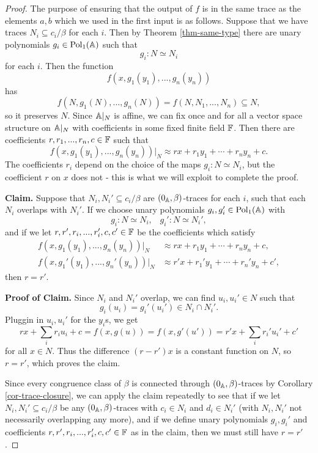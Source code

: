 \begin{appendices}
\begin{proof}
The purpose of ensuring that the output of $f$ is in the same trace as the elements $a,b$ which we used in the first input is as follows. Suppose that we have traces $N_i \subseteq c_i/\beta$ for each $i$. Then by Theorem \ref{thm-same-type} there are unary polynomials $g_i \in \operatorname{Pol}_1(\mathbb{A})$ such that
\[
g_i : N \simeq N_i
\]
for each $i$. Then the function
\[
f(x,g_1(y_1), ..., g_n(y_n))
\]
has
\[
f(N,g_1(N), ..., g_n(N)) = f(N, N_1, ..., N_n) \subseteq N,
\]
so it preserves $N$. Since $\mathbb{A}|_N$ is affine, we can fix once and for all a vector space structure on $\mathbb{A}|_N$ with coefficients in some fixed finite field $\mathbb{F}$. Then there are coefficients $r, r_1, ..., r_n, c \in \mathbb{F}$ such that
\[
f(x,g_1(y_1), ..., g_n(y_n))|_N \approx rx + r_1y_1 + \cdots + r_ny_n + c.
\]
The coefficients $r_i$ depend on the choice of the maps $g_i : N \simeq N_i$, but the coefficient $r$ on $x$ does not - this is what we will exploit to complete the proof.

{\bf Claim.} Suppose that $N_i, N_i' \subseteq c_i/\beta$ are $(0_{\mathbb{A}},\beta)$-traces for each $i$, such that each $N_i$ overlaps with $N_i'$. If we choose unary polynomials $g_i, g_i' \in \operatorname{Pol}_1(\mathbb{A})$ with
\[
g_i : N \simeq N_i, \;\;\; g_i' : N \simeq N_i',
\]
and if we let $r, r', r_i, ..., r_i', c, c' \in \mathbb{F}$ be the coefficients which satisfy
\begin{align*}
f(x,g_1(y_1), ..., g_n(y_n))|_N &\approx rx + r_1y_1 + \cdots + r_ny_n + c,\\
f(x,g_1'(y_1), ..., g_n'(y_n))|_N &\approx r'x + r_1'y_1 + \cdots + r_n'y_n + c',
\end{align*}
then $r = r'$.

{\bf Proof of Claim.} Since $N_i$ and $N_i'$ overlap, we can find $u_i, u_i' \in N$ such that
\[
g_i(u_i) = g_i'(u_i') \in N_i \cap N_i'.
\]
Pluggin in $u_i, u_i'$ for the $y_i$s, we get
\[
rx + \sum_i r_iu_i + c = f(x, g(u)) = f(x,g'(u')) = r'x + \sum_i r_i'u_i' + c'
\]
for all $x \in N$. Thus the difference $(r-r')x$ is a constant function on $N$, so $r = r'$, which proves the claim.

Since every congruence class of $\beta$ is connected through $(0_{\mathbb{A}},\beta)$-traces by Corollary \ref{cor-trace-closure}, we can apply the claim repeatedly to see that if we let $N_i, N_i' \subseteq c_i/\beta$ be any $(0_{\mathbb{A}},\beta)$-traces with $c_i \in N_i$ and $d_i \in N_i'$ (with $N_i, N_i'$ not necessarily overlapping any more), and if we define unary polynomials $g_i, g_i'$ and coefficients $r, r', r_i, ..., r_i', c, c' \in \mathbb{F}$ as in the claim, then we must still have $r = r'$.


\end{proof}
\end{appendices}
